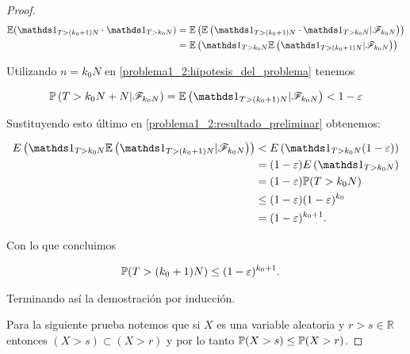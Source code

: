 \begin{proof}
	\begin{align} 
		\E(\indic_{T>(k_0+1)N} \cdot \indic_{T>k_0N}) 	&=		\E\left(\E\left(\indic_{T>(k_0+1)N} \cdot \indic_{T>k_0N} | \F_{k_0N}\right)\right)                                     \\ 
														&=		\E\left(\indic_{T>k_0N} \E\left(\indic_{T>(k_0+1)N}|\F_{k_0N}\right)\right) \label{problema1_2:resultado_preliminar}
	\end{align}\pn
    
	Utilizando  $n=k_0N$ en \eqref{problema1_2:hipotesis_del_problema} tenemos
    
	\begin{align}
		\mw\left(T>k_0N+N|\F_{k_0N}\right) = \E\left(\indic_{T>(k_0+1)N}|\F_{k_0N}\right) < 1-\varepsilon
	\end{align}\pn
    
	Sustituyendo esto último en \eqref{problema1_2:resultado_preliminar} obtenemos:
    
    \begin{align}
             E\left(\indic_{T>k_0N} \E\left(\indic_{T>(k_0+1)N}|\F_{k_0N}\right)\right) 	&< 		E\left(\indic_{T>k_0N} (1-\varepsilon)\right)   \\
                                                                                            &=	 	(1-\varepsilon) E\left(\indic_{T>k_0N} \right)  \\
                                                                                            &=		(1-\varepsilon) \mw(T>k_0N)                     \\
                                                                                            &\leq   (1-\varepsilon)(1-\varepsilon)^{k_0}            \\
                                                                                            &= (1-\varepsilon)^{k_0 + 1}.
    \end{align}\pn
        
	Con lo que concluimos
    
    \begin{align}
        \mathbb{P}(T>(k_0+1)N) &\leq (1-\varepsilon)^{k_0 + 1}.
    \end{align}\pn
        
	Terminando así la demostración por inducción.\pn
	
	
	Para la siguiente prueba notemos que si $X$ es una variable aleatoria y $r > s \in \mathbb{R}$ entonces
	$(X > s) \subset (X > r)$ y por lo tanto $\mathbb{P}(X > s) \leq \mathbb{P}(X > r)$.\pn
	

\end{proof}
